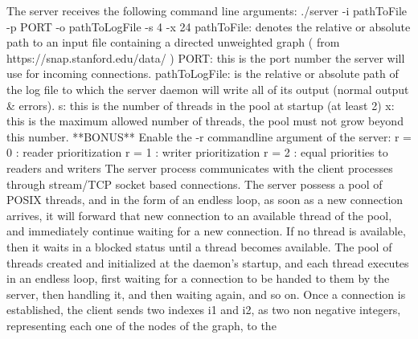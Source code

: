 \documentclass[twoside,11pt]{article}
\begin{document}
The server receives the following command line arguments: \newline
\newline
./server -i pathToFile -p PORT -o pathToLogFile -s 4 -x 24 \newline
\newline
pathToFile: denotes the relative or absolute path to an input file containing a directed unweighted graph ( from https://snap.stanford.edu/data/ ) \newline
\newline
PORT: this is the port number the server will use for incoming connections.\newline
\newline
pathToLogFile: is the relative or absolute path of the log file to which the server daemon will write all of its output (normal output & errors).\newline
\newline
s: this is the number of threads in the pool at startup (at least 2)\newline
\newline
x: this is the maximum allowed number of threads, the pool must not grow beyond this number.\newline
\newline
**BONUS** \newline
Enable the -r commandline argument of the server:\newline
r = 0 : reader prioritization \newline
r = 1 : writer prioritization \newline
r = 2 : equal priorities to readers and writers \newline
\newline
The server process communicates with the client processes through stream/TCP socket based connections. The server possess a pool of POSIX threads, and in the form of an endless loop, as soon as a new connection arrives, it will forward that new connection to an available thread of the pool, and immediately continue waiting for a new connection. If no thread is available, then it waits in a blocked status until a thread becomes available. \newline
\newline
The pool of threads created and initialized at the daemon’s startup, and each thread executes in an endless loop, first waiting for a connection to be handed to them by the server, then handling it, and then waiting again, and so on. Once a connection is established, the client sends two indexes i1 and i2, as two non negative integers, representing each one of the nodes of the graph, to the
\end{document}
